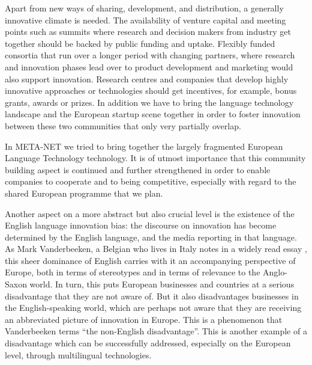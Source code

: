 \documentclass[10pt, plain]{../../metanetpaper}
\begin{document}
\begin{multicols}{2}
Apart from new ways of sharing, development, and distribution, a generally innovative climate is needed. The availability of venture capital and meeting points such as summits where research and decision makers from industry get together should be backed by public funding and uptake. Flexibly funded consortia that run over a longer period with changing partners, where research and innovation phases lead over to product development and marketing would also support innovation. Research centres and companies that develop highly innovative approaches or technologies should get incentives, for example, bonus grants, awards or prizes. In addition we have to bring the language technology landscape and the European startup scene together in order to foster innovation between these two communities that only very partially overlap.

In META-NET we tried to bring together the largely fragmented European Language Technology technology. It is of utmost importance that this community building aspect is continued and further strengthened in order to enable companies to cooperate and to being competitive, especially with regard to the shared European programme that we plan. 

Another aspect on a more abstract but also crucial level is the existence of the English language innovation bias: the discourse on innovation has become determined by the English language, and the media reporting in that language. As Mark Vanderbeeken, a Belgian who lives in Italy notes in a widely read essay \cite{vanderbeeken2012}, this sheer dominance of English carries with it an accompanying perspective of Europe, both in terms of stereotypes and in terms of relevance to the Anglo-Saxon world. In turn, this puts European businesses and countries at a serious disadvantage that they are not aware of. But it also disadvantages businesses in the English-speaking world, which are perhaps not aware that they are receiving an abbreviated picture of innovation in Europe. This is a phenomenon that Vanderbeeken terms ``the non-English disadvantage''. This is another example of a disadvantage which can be successfully addressed, especially on the European level, through multilingual technologies.



\end{multicols}
\end{document}
